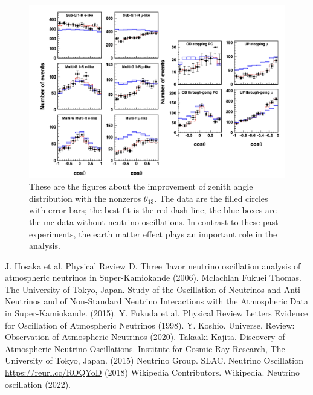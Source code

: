 \documentclass[12pt]{article}
\begin{document}
    \begin{figure}[H]
        \centering
        \includegraphics[width = 1\textwidth]{../figure/result2.png}
        \caption{These are the figures about the improvement of zenith angle distribution with the nonzeros $\theta_{13}$. The data are the filled circles with error bars; the best fit is the red dash line; the blue boxes are the mc data without neutrino oscillations. In contrast to these past experiments, the earth matter effect plays an important role in the analysis. \cite{SKexp}}
        \label{result2}
    \end{figure}

\begin{multicols}{2}

\begin{thebibliography}{1}

	
     J. Hosaka et al. Physical Review D. Three flavor neutrino oscillation analysis of atmospheric neutrinos in Super-Kamiokande (2006).
     Mclachlan Fukuei Thomas. The University of Tokyo, Japan. Study of the Oscillation of Neutrinos and Anti-Neutrinos and of Non-Standard Neutrino Interactions with the Atmospheric Data in Super-Kamiokande. (2015).
     Y. Fukuda et al. Physical Review Letters Evidence for Oscillation of Atmospheric Neutrinos (1998).
    Y. Koshio. Universe. Review: Observation of Atmospheric Neutrinos (2020).
    Takaaki Kajita. Discovery of Atmospheric Neutrino Oscillations. Institute for Cosmic Ray Research, The University of Tokyo, Japan. (2015)
     Neutrino Group. SLAC. Neutrino Oscillation \url{https://reurl.cc/ROQYoD} (2018)
     Wikipedia Contributors. Wikipedia. Neutrino oscillation (2022).
    
\end{thebibliography}

\end{multicols}
\end{document}
